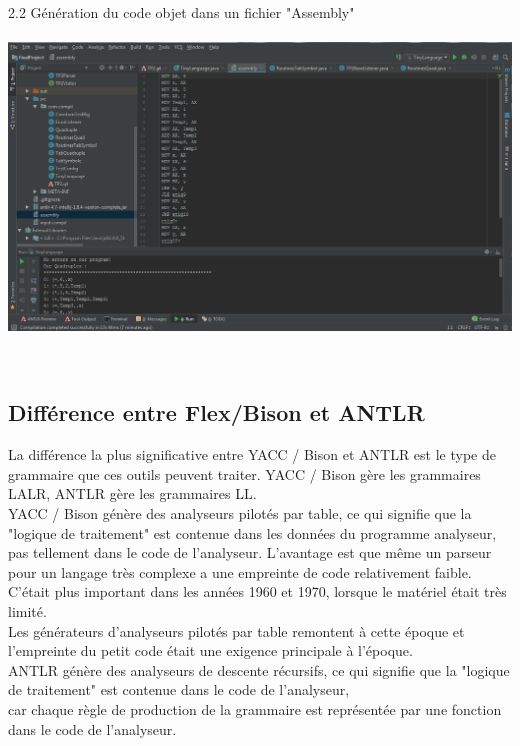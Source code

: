\documentclass[12pt]{article}
\begin{document}
\texttt{ }\\
2.2 Génération du code objet dans un fichier "Assembly"\\
\texttt{ }\\
\includegraphics[width=1\textwidth]{IMG/Exe_Obj.png}


\texttt{ }\\
\subsection{Différence entre Flex/Bison et ANTLR}

La différence la plus significative entre YACC / Bison et ANTLR est le type de grammaire que ces outils peuvent traiter. 
YACC / Bison gère les grammaires LALR, ANTLR gère les grammaires LL.\\

YACC / Bison génère des analyseurs pilotés par table, ce qui signifie que la "logique de traitement" est contenue dans les données du programme analyseur,\\
 pas tellement dans le code de l'analyseur. L'avantage est que même un parseur pour un langage très complexe a une empreinte de code relativement faible.\\
 C'était plus important dans les années 1960 et 1970, lorsque le matériel était très limité. \\
 
 Les générateurs d'analyseurs pilotés par table remontent à cette époque et l'empreinte du petit code était une exigence principale à l'époque.\\

 
ANTLR génère des analyseurs de descente récursifs, ce qui signifie que la "logique de traitement" est contenue dans le code de l'analyseur,\\
 car chaque règle de production de la grammaire est représentée par une fonction dans le code de l'analyseur.\\ 
 
\end{document}
